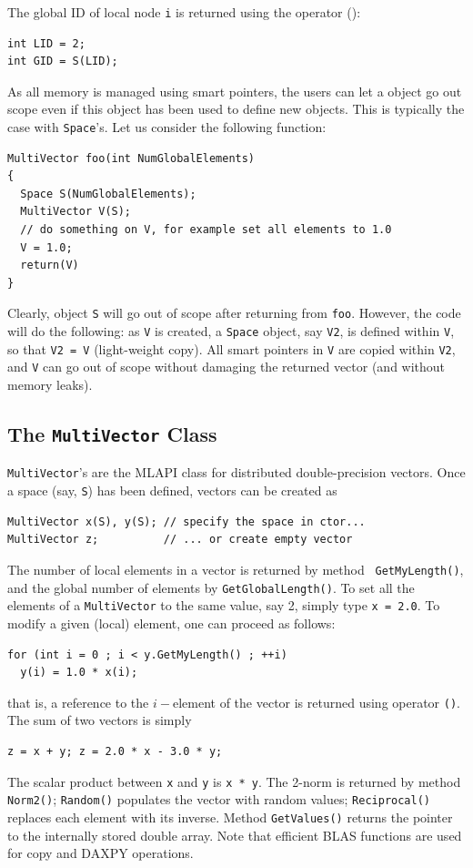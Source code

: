 \documentclass{article}[11pt]
\newcommand{\MLAPI}  {{\sc MLAPI }}
\begin{document}
The global ID of local node {\tt i} is returned using the operator ():
\begin{verbatim}
int LID = 2;
int GID = S(LID);
\end{verbatim}

\smallskip

As all memory is managed using smart pointers, the users can let a object go
out scope even if this object has been used to define new objects. This is
typically the case with {\tt Space}'s. Let us consider the following function:
\begin{verbatim}
MultiVector foo(int NumGlobalElements)
{
  Space S(NumGlobalElements);
  MultiVector V(S);
  // do something on V, for example set all elements to 1.0
  V = 1.0;
  return(V)
}
\end{verbatim}
Clearly, object {\tt S} will go out of scope after returning from {\tt foo}.
However, the code will do the following: as {\tt V} is created, a {\tt Space}
object, say {\tt V2}, is defined within {\tt V}, so that {\tt V2 = V}
(light-weight copy). All smart pointers in {\tt V} are copied within {\tt V2},
and {\tt V} can go out of scope without damaging the returned vector 
(and without memory leaks).

\subsection{The {\tt MultiVector} Class}
\label{sec:multivector}

{\tt MultiVector}'s are the \MLAPI class for distributed double-precision
vectors. Once a space (say, {\tt S}) has been defined, vectors can be created
as
\begin{verbatim}
MultiVector x(S), y(S); // specify the space in ctor...
MultiVector z;          // ... or create empty vector
\end{verbatim}

The number of local elements in a vector is returned by method {\tt
  GetMyLength()}, and the global number of elements by
{\tt GetGlobalLength()}. To set all the elements of a {\tt MultiVector} to the same value, say 2, simply type {\tt x = 2.0}. To modify a given (local) element, one can proceed as follows:
\begin{verbatim}
for (int i = 0 ; i < y.GetMyLength() ; ++i)
  y(i) = 1.0 * x(i);
\end{verbatim}
that is, a reference to the $i-$element of the vector is returned using
operator \verb!()!.  The sum of two vectors is simply
\begin{verbatim}
z = x + y; z = 2.0 * x - 3.0 * y; 
\end{verbatim}
The scalar product between {\tt x} and {\tt y} is {\tt x * y}. The 2-norm is
returned by method {\tt Norm2()}; {\tt Random()} populates the vector with
random values; {\tt Reciprocal()} replaces each element with its inverse. 
Method {\tt GetValues()} returns the pointer to the internally stored double
array. Note
that efficient BLAS functions are used for copy and DAXPY operations. 
\end{document}
